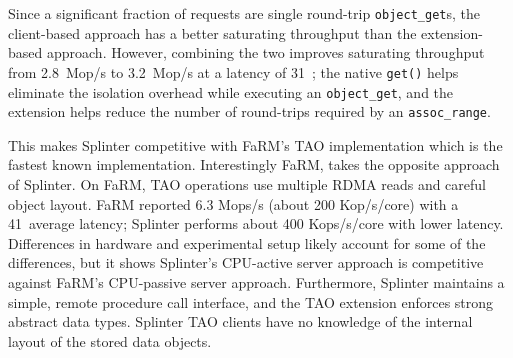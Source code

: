 Since a significant fraction of requests are single round-trip
\texttt{object\_get}s, the client-based approach has a better
saturating throughput than the extension-based approach. However,
combining the two improves
saturating throughput from 2.8~Mop/s to 3.2~Mop/s at a latency of
31~\us;
the native \texttt{get()} helps eliminate the isolation
overhead while executing an \texttt{object\_get}, and the extension helps
reduce the number of round-trips required by an \texttt{assoc\_range}.

This makes Splinter competitive with FaRM's TAO implementation which is the
  fastest known implementation.
Interestingly FaRM, takes the opposite approach of Splinter.
On FaRM, TAO operations use multiple RDMA reads and careful
  object layout.
FaRM reported 6.3 Mops/s (about 200 Kop/s/core) with a 41~\us average latency;
  Splinter performs about 400 Kops/s/core with lower latency.
Differences in hardware and experimental setup likely account for some
  of the differences, but it shows Splinter's CPU-active server approach
  is competitive against FaRM's CPU-passive server approach.
Furthermore, Splinter maintains a simple, remote procedure call interface, and
the TAO extension enforces strong abstract data types.
Splinter TAO clients have no knowledge of the internal layout of the stored
  data objects.

